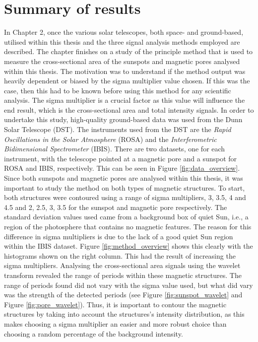 \section{Summary of results}
    
    In Chapter 2, once the various solar telescopes, both space- and ground-based, utilised within this thesis and the three signal analysis methods employed are described.
    The chapter finishes on a study of the principle method that is used to measure the cross-sectional area of the sunspots and magnetic pores analysed within this thesis.
    The motivation was to understand if the method output was heavily dependent or biased by the sigma multiplier value chosen.
    If this was the case, then this had to be known before using this method for any scientific analysis.    
    The sigma multiplier is a crucial factor as this value will influence the end result, which is the cross-sectional area and total intensity signals.
    In order to undertake this study, high-quality ground-based data was used from the Dunn Solar Telescope (DST).
    The instruments used from the DST are the \textit{Rapid Oscillations in the Solar Atmosphere} (ROSA) and the \textit{Interferometric Bidimensional Spectrometer} (IBIS).
    There are two datasets, one for each instrument, with the telescope pointed at a magnetic pore and a sunspot for ROSA and IBIS, respectively.
    This can be seen in Figure \ref{fig:data_overview}.
    Since both sunspots and magnetic pores are analysed within this thesis, it was important to study the method on both types of magnetic structures.
    To start, both structures were contoured using a range of sigma multipliers, 3, 3.5, 4 and 4.5 and 2, 2.5, 3, 3.5 for the sunspot and magnetic pore respectively.
    The standard deviation values used came from a background box of quiet Sun, i.e., a region of the photosphere that contains no magnetic features.
    The reason for this difference in sigma multipliers is due to the lack of a good quiet Sun region within the IBIS dataset.
    Figure \ref{fig:method_overview} shows this clearly with the histograms shown on the right column.
    This had the result of increasing the sigma multipliers.
    Analysing the cross-sectional area signals using the wavelet transform revealed the range of periods within these magnetic structures.
    The range of periods found did not vary with the sigma value used, but what did vary was the strength of the detected periods (see Figure \ref{fig:sunspot_wavelet} and Figure \ref{fig:pore_wavelet}).
    Thus, it is important to contour the magnetic structures by taking into account the structures's intensity distribution, as this makes choosing a sigma multiplier an easier and more robust choice than choosing a random percentage of the background intensity. 
